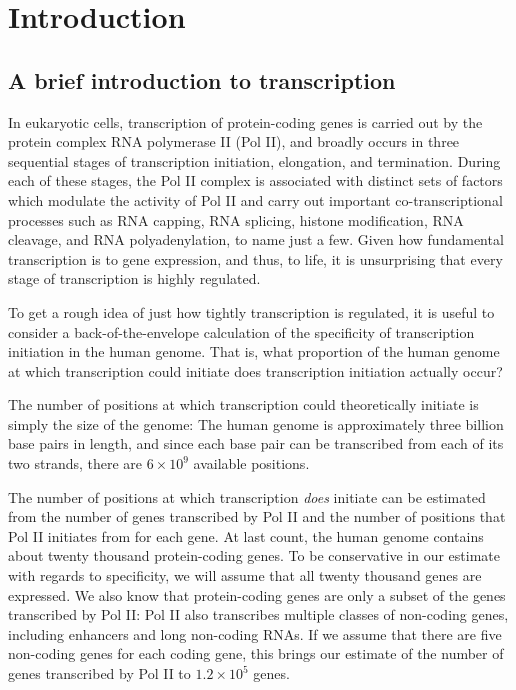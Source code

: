 \chapter{Introduction}

\section{A brief introduction to transcription}

In eukaryotic cells, transcription of protein-coding genes is carried out by the protein complex RNA polymerase II (Pol II), and broadly occurs in three sequential stages of transcription initiation, elongation, and termination.
During each of these stages, the Pol II complex is associated with distinct sets of factors which modulate the activity of Pol II and carry out important co-transcriptional processes such as RNA capping, RNA splicing, histone modification, RNA cleavage, and RNA polyadenylation, to name just a few.
Given how fundamental transcription is to gene expression, and thus, to life, it is unsurprising that every stage of transcription is highly regulated.

To get a rough idea of just how tightly transcription is regulated, it is useful to consider a back-of-the-envelope calculation of the specificity of transcription initiation in the human genome.
That is, what proportion of the human genome at which transcription could initiate does transcription initiation actually occur?

The number of positions at which transcription could theoretically initiate is simply the size of the genome: The human genome is approximately three billion base pairs in length, and since each base pair can be transcribed from each of its two strands, there are $6 \times 10^9$ available positions.

The number of positions at which transcription \textit{does} initiate can be estimated from the number of genes transcribed by Pol II and the number of positions that Pol II initiates from for each gene.
At last count, the human genome contains about twenty thousand protein-coding genes.
To be conservative in our estimate with regards to specificity, we will assume that all twenty thousand genes are expressed.
We also know that protein-coding genes are only a subset of the genes transcribed by Pol II: Pol II also transcribes multiple classes of non-coding genes, including enhancers and long non-coding RNAs.
If we assume that there are five non-coding genes for each coding gene, this brings our estimate of the number of genes transcribed by Pol II to $1.2 \times 10^5$ genes.

